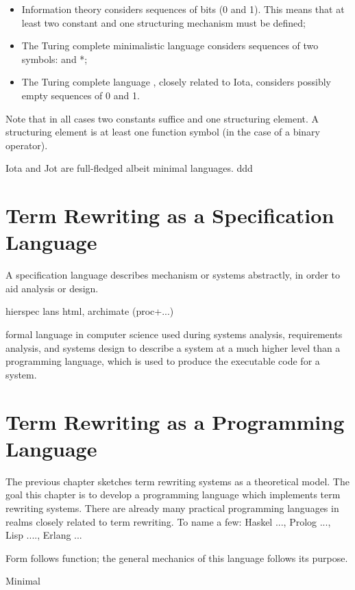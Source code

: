 \documentclass[11pt,twoside]{memoir}
\newcommand{\D}[1]{\index{#1}\defn{#1}}
\begin{document}
\begin{itemize}
	\item Information theory considers sequences of bits (0 and 1). This means that at least two constant and one structuring mechanism must be defined;
	\item The Turing complete minimalistic language \D{Iota} considers sequences of two symbols: \D{i} and *;
	\item The Turing complete language \D{Jot}, closely related to Iota, considers possibly empty sequences of 0 and 1.
\end{itemize}

Note that in all cases two constants suffice and one structuring element. A structuring element is at least one function symbol (in the case of a binary operator).

Iota and Jot are full-fledged albeit minimal languages.
ddd



\chapter{Term Rewriting as a Specification Language}
\label{ch:traasl}

A specification language describes mechanism or systems abstractly, in order to aid analysis or design. 

hierspec lans html, archimate (proc+...) 

formal language in computer science used during systems analysis, requirements analysis, and systems design to describe a system at a much higher level than a programming language, which is used to produce the executable code for a system.


\chapter{Term Rewriting as a Programming Language}
\label{ch:traapl}



The previous chapter sketches term rewriting systems as a theoretical model.  The goal this chapter is to develop a programming language which implements term rewriting systems. There are already many practical programming languages in realms closely related to term rewriting. To name a few:
Haskel ..., Prolog ..., Lisp ...., Erlang ...

Form follows function; the general mechanics of this language follows its purpose. 


Minimal
\end{document}
